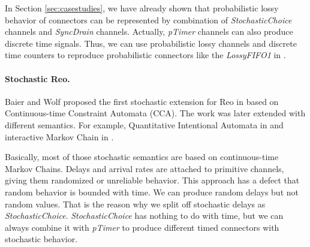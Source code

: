 In Section \ref{sec:casestudies}, we have already shown that probabilistic lossy behavior of connectors can be represented by combination of \emph{StochasticChoice} channels and \emph{SyncDrain} channels. Actually, \emph{pTimer} channels can also produce discrete time signals. Thus, we can use probabilistic lossy channels and discrete time counters to reproduce probabilistic connectors like the \emph{LossyFIFO1} in \cite{Models2005}.

\paragraph{Stochastic Reo.}
Baier and Wolf proposed the first stochastic extension for Reo in \cite{Baier2006} based on Continuous-time Constraint Automata (CCA). The work was later extended with different semantics. For example, Quantitative Intentional Automata in \cite{Arbab2009} and interactive Markov Chain in \cite{Oliveira2016}.

Basically, most of those stochastic semantics are based on continuous-time Markov Chains. Delays and arrival rates are attached to primitive channels, giving them randomized or unreliable behavior. This approach has a defect that random behavior is bounded with time. We can produce random delays but not random values. That is the reason why we split off stochastic delays as \emph{StochasticChoice}. \emph{StochasticChoice} has nothing to do with time, but we can always combine it with \emph{pTimer} to produce different timed connectors with stochastic behavior.





        
